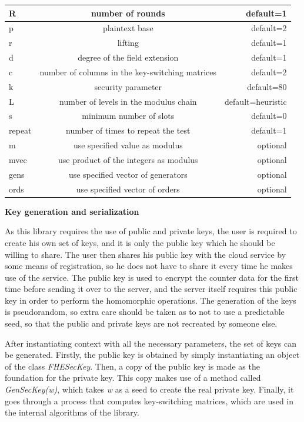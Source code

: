   \begin{tabular}{|l|c|r|}
    \hline 
    R  &     number of rounds &  default=1     \\ \hline
    p  &     plaintext base  & default=2  \\ \hline
    r  &     lifting  & default=1  \\ \hline
    d  &     degree of the field extension  & default=1  \\ \hline
    c  &     number of columns in the key-switching matrices  & default=2  \\ \hline
    k  &     security parameter & default=80  \\ \hline
    L  &     number of levels in the modulus chain  & default=heuristic  \\ \hline
    s  &     minimum number of slots  & default=0  \\ \hline
    repeat &  number of times to repeat the test & default=1  \\ \hline
    m   &    use specified value as modulus & optional  \\ \hline
    mvec &   use product of the integers as  modulus & optional \\ \hline
    gens &   use specified vector of generators & optional \\ \hline
    ords  &  use specified vector of orders & optional \\ \hline
  \end{tabular}


\textbf{Key generation and serialization}

As this library requires the use of public and private keys, the user is required to create his own set of keys, and it is only the public key which he should be willing to share. The user then shares his public key with the cloud service by some means of registration, so he does not have to share it every time he makes use of the service. The public key is used to encrypt the counter data for the first time before sending it over to the server, and the server itself requires this public key in order to perform the homomorphic operations.
The generation of the keys is pseudorandom, so extra care should be taken as to not to use a predictable seed, so that the public and private keys are not recreated by someone else. 

After instantiating context with all the necessary parameters, the set of keys can be generated. Firstly, the public key is obtained by simply instantiating an object of the class \textit{FHESecKey}. Then, a copy of the public key is made as the foundation for the private key. This copy makes use of a method called \textit{GenSecKey(w)}, which takes \textit{w} as a seed to create the real private key. Finally, it goes through a process that computes key-switching matrices, which are used in the internal algorithms of the library.

